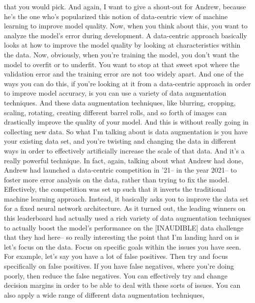 {{    that you would pick.
    And again, I want to give a shout-out for Andrew,
    because he's the one who's popularized this notion
    of data-centric view of machine learning to improve model quality.
    Now, when you think about this, you want to analyze the model's error
    during development.
    A data-centric approach basically looks at how
    to improve the model quality by looking at characteristics within the data.
    Now, obviously, when you're training the model,
    you don't want the model to overfit or to underfit.
    You want to stop at that sweet spot where
    the validation error and the training error are not too widely apart.
    And one of the ways you can do this, if you're
    looking at it from a data-centric approach in order
    to improve model accuracy, is you can use a variety of data augmentation
    techniques.
    And these data augmentation techniques, like blurring, cropping,
    scaling, rotating, creating different barrel rolls, and so forth of images
    can drastically improve the quality of your model.
    And this is without really going in collecting new data.
    So what I'm talking about is data augmentation
    is you have your existing data set, and you're twisting and changing
    the data in different ways in order to effectively artificially increase
    the scale of that data.
    And it's a really powerful technique.
    In fact, again, talking about what Andrew had done,
    Andrew had launched a data-centric competition in '21--
    in the year 2021-- to foster more error analysis on the data,
    rather than trying to fix the model.
    Effectively, the competition was set up such
    that it inverts the traditional machine learning approach.
    Instead, it basically asks you to improve
    the data set for a fixed neural network architecture.
    As it turned out, the leading winners on this leaderboard had actually used
    a rich variety of data augmentation techniques to actually boost
    the model's performance on the [INAUDIBLE] data challenge that they
    had here--
    so really interesting the point that I'm landing hard on
    is let's focus on the data.
    Focus on specific goals within the issues you have seen.
    For example, let's say you have a lot of false positives.
    Then try and focus specifically on false positives.
    If you have false negatives, where you're doing poorly,
    then reduce the false negatives.
    You can effectively try and change decision margins
    in order to be able to deal with these sorts of issues.
    You can also apply a wide range of different data augmentation techniques,
}}
